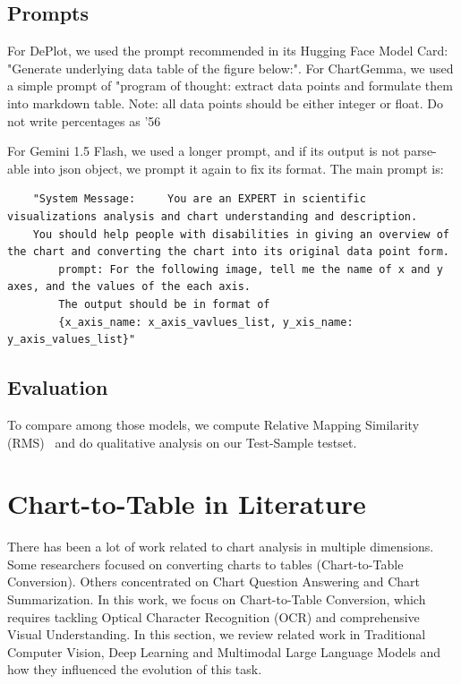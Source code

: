 \documentclass[
	letterpaper, %
]{jdf}
\begin{document}
       \subsection{Prompts}\label{ssect:prompts}
       For DePlot, we used the prompt recommended in its Hugging Face Model Card: "Generate underlying data table of the figure below:".
       For ChartGemma, we used a simple prompt of "program of thought: extract data points and formulate them into markdown table.
    Note: all data points should be either integer or float.
    Do not write percentages as '56%

    For Gemini 1.5 Flash, we used a longer prompt, and if its output is not parse-able into json object, we prompt it again to fix its format.
    The main prompt is: 
\begin{verbatim}
    "System Message:     You are an EXPERT in scientific visualizations analysis and chart understanding and description.
    You should help people with disabilities in giving an overview of the chart and converting the chart into its original data point form.
        prompt: For the following image, tell me the name of x and y axes, and the values of the each axis.
        The output should be in format of 
        {x_axis_name: x_axis_vavlues_list, y_xis_name: y_axis_values_list}"
        \end{verbatim}

\subsection{Evaluation}\label{ssect:method-eval}
To compare among those models, we compute Relative Mapping Similarity (RMS)~\cite{liu2022deplot} and do qualitative analysis on our Test-Sample testset.

\section{Chart-to-Table in Literature}\label{sect:literature}
There has been a lot of work related to chart analysis in multiple dimensions.
Some researchers focused on converting charts to tables (Chart-to-Table Conversion).
Others concentrated on Chart Question Answering and Chart Summarization.
In this work, we focus on Chart-to-Table Conversion, which requires tackling Optical Character Recognition (OCR) and comprehensive Visual Understanding.
In this section, we review related work in Traditional Computer Vision, Deep Learning and Multimodal Large Language Models and how they influenced the evolution of this task.
\end{document}
